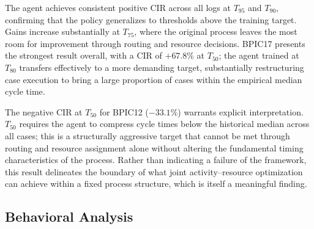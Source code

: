 \documentclass[runningheads]{llncs}
\begin{document}
The agent achieves consistent positive CIR across all logs at 
$T_{95}$ and $T_{90}$, confirming that the policy generalizes 
to thresholds above the training target. Gains increase 
substantially at $T_{75}$, where the original process leaves 
the most room for improvement through routing and resource 
decisions. BPIC17 presents the strongest result overall, with 
a CIR of $+67.8\%$ at $T_{50}$; the agent trained at $T_{80}$ 
transfers effectively to a more demanding target, substantially 
restructuring case execution to bring a large proportion of 
cases within the empirical median cycle time.

The negative CIR at $T_{50}$ for BPIC12 ($-33.1\%$) warrants 
explicit interpretation. $T_{50}$ requires the agent to compress 
cycle times below the historical median across all cases; this is 
a structurally aggressive target that cannot be met through 
routing and resource assignment alone without altering the 
fundamental timing characteristics of the process. Rather than 
indicating a failure of the framework, this result delineates 
the boundary of what joint activity--resource optimization can 
achieve within a fixed process structure, which is itself a 
meaningful finding.

\subsection{Behavioral Analysis}
\label{subsec:behavior}
\end{document}
